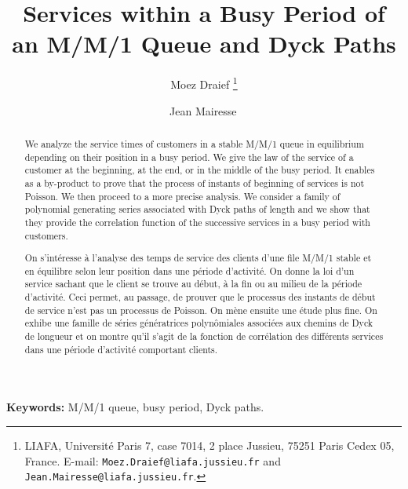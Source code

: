 \documentclass[11pt,a4paper]{article}
\numberwithin{equation}{section}
\newcommand{\1}{\mathbbm{1}}
\begin{document}
\noindent

\title{\bf Services within a Busy Period of an M/M/1 Queue and Dyck
  Paths}




\author{Moez {\sc Draief}
\thanks{LIAFA, Universit{\'e} Paris 7, case 7014,
2 place Jussieu, 75251 Paris Cedex 05, France.
E-mail: {\tt Moez.Draief@liafa.jussieu.fr}
and {\tt  Jean.Mairesse@liafa.jussieu.fr}.}
\and
Jean {\sc Mairesse}\,\footnotemark[1]
}

\maketitle

\begin{abstract}

We analyze the service times of customers in a stable M/M/1 queue in
equilibrium depending on their position in a busy period.
We give the law of the service of a customer at the beginning, at the end,
or in the middle of the busy period. It enables as a by-product to prove
that the process of instants of beginning of services is not Poisson.
We then proceed to a more precise analysis. We consider a family of
polynomial generating series associated with Dyck paths of length 
and we show that they provide the correlation function of the
successive services in a busy period with  customers.

\end{abstract}

\renewcommand\abstractname{R\'esum\'e}
\begin{abstract}
On s'int\'eresse \`a l'analyse des temps de service des clients
d'une file M/M/1 stable et en \'equilibre selon
leur position dans une p\'eriode d'activit\'e.
On donne la loi d'un service sachant que le client se
trouve au d\'ebut, \`a la fin ou au milieu de la p\'eriode d'activit\'e. Ceci
permet, au passage, de prouver que le processus des instants de
d\'ebut de service n'est pas un processus de
Poisson. On m\`ene ensuite une \'etude plus fine.
On exhibe une famille de s\'eries g\'en\'eratrices
polyn\^omiales associ\'ees aux chemins de Dyck de longueur   et on
montre qu'il s'agit de la fonction de corr\'elation des diff\'erents services dans une
p\'eriode d'activit\'e comportant  clients.
\end{abstract}


\smallskip

{\noindent\bf Keywords:} M/M/1 queue, busy period, Dyck paths.

\smallskip
\end{document}
